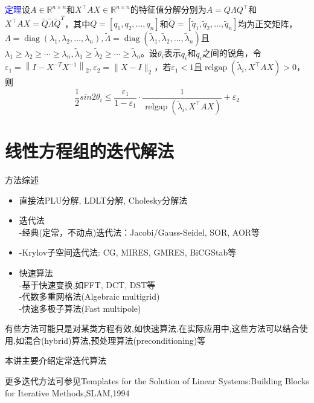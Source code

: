 \documentclass[12pt,a4paper]{article}
\begin{document}
\textcolor{blue}{定理}\quad 设$A \in \mathbb{R}^{n \times n}$和$X^{\top} A X \in \mathbb{R}^{n \times n}$的特征值分解分别为$A=Q \Lambda Q^{\top}$和$X^{\top} A X=\tilde{Q} \tilde{\Lambda} \tilde{Q}^T$，其中$Q=\left[q_{1}, q_{2}, \ldots, q_{n}\right]$和$\tilde{Q}=\left[\tilde{q}_{1}, \tilde{q}_{2}, \ldots, \tilde{q}_{n}\right]$均为正交矩阵，$\Lambda=\operatorname{diag}\left(\lambda_{1}, \lambda_{2}, \ldots, \lambda_{n}\right), \tilde{\Lambda}=\operatorname{diag}\left(\tilde{\lambda}_{1}, \tilde{\lambda}_{2}, \ldots, \tilde{\lambda}_{n}\right)$且$\lambda_{1} \geq \lambda_{2} \geq \cdots \geq \lambda_{n}, \tilde{\lambda}_{1} \geq \tilde{\lambda}_{2} \geq \cdots \geq \tilde{\lambda}_{n}$。设$\theta_{i}$表示$q_i$和$\tilde{q}_{i}$之间的锐角，令$\varepsilon_{1}=\left\|I-X^{-T} X^{-1}\right\|_{2}, \varepsilon_{2}=\|X-I\|_{2}$，若$\varepsilon_{1}<1$且$\operatorname{relgap}\left(\tilde{\lambda}_{i}, X^{\top} A X\right)>0$，则
$$
\frac{1}{2} sin2 \theta_{i} \leq \frac{\varepsilon_{1}}{1-\varepsilon_{1}} \cdot \frac{1}{\operatorname {relgap}\left(\tilde {\lambda}_{i}, X^{\top} A X\right)}+\varepsilon_{2}
$$
\section{线性方程组的迭代解法}

方法综述

\begin {itemize}
\item 直接法\quad PLU分解, LDLT分解, Cholesky分解法\\
\item 迭代法\\
-经典(定常，不动点)迭代法：Jacobi/Gauss-Seidel, SOR, AOR等\\
\item -Krylov子空间迭代法: CG, MIRES, GMRES, BiCGStab等\\
\item 快速算法\\
-基于快速变换,如FFT, DCT, DST等\\
-代数多重网格法(Algebraic multigrid)\\
-快速多极子算法(Fast multipole)\\
\end{itemize}
有些方法可能只是对某类方程有效,如快速算法.在实际应用中,这些方法可以结合使用,如混合(hybrid)算法,预处理算法(preconditioning)等\\
\centerline{本讲主要介绍定常迭代算法}
更多迭代方法可参见{\color{blue}Templates for the Solution of Linear Systems:Building Blocks for Iterative Methods,}SLAM,1994\\
\end{document}
